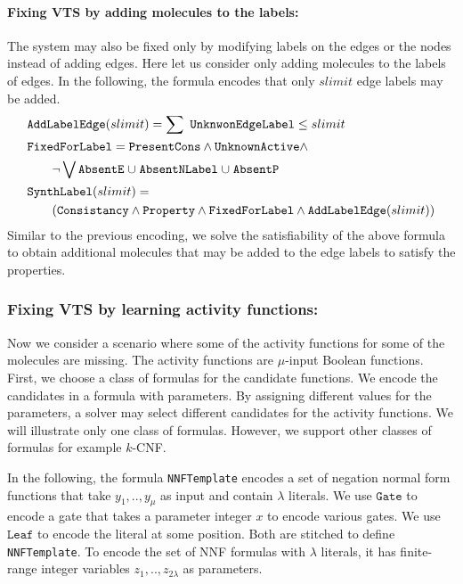 \paragraph{\bf Fixing VTS by adding molecules to the labels:}
The system may also be fixed only by modifying labels on the edges or the nodes instead
of adding edges.
%
Here let us consider only adding molecules to the labels of edges.
%
In the following, the formula encodes that only $slimit$ edge labels may be added.
\begin{align*}
  &\texttt{AddLabelEdge}(slimit) = 
    \sum~\texttt{UnknwonEdgeLabel}  \leq slimit\\
  & \texttt{FixedForLabel} = \texttt{PresentCons} \land \texttt{UnknownActive} \land\\
  & \quad \quad \lnot \bigvee \texttt{AbsentE} \;{\cup}\;
                    \texttt{AbsentNLabel} \;{\cup}\;
                    \texttt{AbsentP}\\
  &\texttt{SynthLabel}(slimit) = \\
  & \quad\quad
    (  \texttt{Consistancy}\land \texttt{Property} \land
   \texttt{FixedForLabel} \land \texttt{AddLabelEdge}(slimit) )
\end{align*} 
Similar to the previous encoding, we solve the
satisfiability of the above formula to obtain additional molecules
that may be added to the edge labels to satisfy the properties.



\subsubsection{Fixing VTS by learning activity functions:}

Now we consider a scenario where some of the activity functions for some of the molecules
are missing.
%
The activity functions are $\mu$-input Boolean functions.
%
First, we choose a class of formulas for the candidate functions.
%
We encode the candidates in a formula with parameters.
%
By assigning different values for the parameters, a solver may select
different candidates for the activity functions.
%
We will illustrate only one class of formulas.
%
However, we support other classes of formulas for example $k$-CNF.

In the following, the formula \texttt{NNFTemplate} encodes a set of
negation normal form functions that take $y_1,..,y_\mu$ as input and
contain $\lambda$ literals.
%
We use $\texttt{Gate}$ to encode a gate that takes a parameter integer
$x$ to encode various gates.
%
We use $\texttt{Leaf} $ to encode the literal at some position.
%
Both are stitched to define \texttt{NNFTemplate}.
%
To encode the set of NNF formulas with $\lambda$ literals, it has
finite-range integer variables
$z_1,..,z_{2\lambda}$ as parameters.

